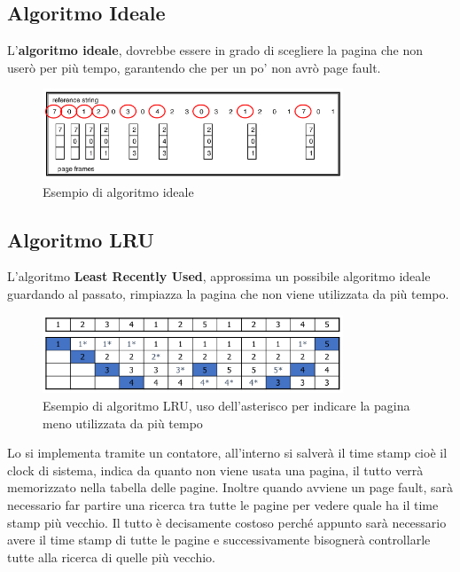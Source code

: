 \documentclass[a4paper, 12pt]{book}
\begin{document}
\subsection{Algoritmo Ideale}

L'\textbf{algoritmo ideale}, dovrebbe essere in grado di scegliere la pagina che non userò per più tempo, garantendo che per un po'
 non avrò page fault.

\begin{figure}
    \includegraphics[width=0.8\textwidth]{ideale.png}
    \caption{Esempio di algoritmo ideale}
\end{figure}

\subsection{Algoritmo LRU}

L'algoritmo \textbf{Least Recently Used}, approssima un possibile algoritmo ideale guardando al passato, rimpiazza la pagina
che non viene utilizzata da più tempo.

\begin{figure}
    \includegraphics[width=0.8\textwidth]{LRU.png}
    \caption{Esempio di algoritmo LRU, uso dell'asterisco per indicare la pagina meno utilizzata da più tempo}
\end{figure}

Lo si implementa tramite un contatore, all'interno si salverà il time stamp cioè il clock di sistema, indica da quanto non viene 
usata una pagina, il tutto verrà memorizzato nella tabella delle pagine. Inoltre quando avviene un page fault, sarà necessario far 
partire una ricerca tra tutte le pagine per vedere quale ha il time stamp più vecchio. Il tutto è decisamente costoso perché appunto 
sarà necessario avere il time stamp di tutte le pagine e successivamente bisognerà controllarle tutte alla ricerca di quelle più 
vecchio.
\end{document}
